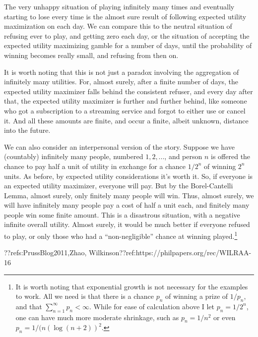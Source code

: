 The very unhappy situation of playing infinitely many times and eventually starting to lose every time is the almost 
sure result of following expected utility maximization on each day. We can compare this to the neutral situation of 
refusing ever to play, and getting zero each day, or the situation of accepting the expected utility maximizing gamble
for a number of days, until the probability of winning becomes really small, and refusing from then on.

It is worth noting that this is not just a paradox involving the aggregation of infinitely many utilities.
For, almost surely, after a finite number of days, the expected utility maximizer
falls behind the consistent refuser, and every day after that, the expected utility maximizer is further and further behind,
like someone who got a subscription to a streaming service and forgot to either use or cancel it. And all these amounts are 
finite, and occur a finite, albeit unknown, distance into the future.

We can also consider an interpersonal version of the story. Suppose we have (countably) infinitely many people, numbered $1,2,...$, and person $n$ 
is offered the chance to pay half a unit of utility in exchange for a chance $1/2^n$ of winning $2^n$ units. As before, by expected utility
considerations it's worth it. So, if everyone is an expected utility maximizer, everyone will pay. But by the Borel-Cantelli Lemma, 
almost surely, only finitely many people will win. Thus, almost surely, we will have infinitely many people
pay a cost of half a unit each, and finitely many people win some finite amount. This is a disastrous situation, with a negative infinite
overall utility. Almost surely, it would be much better if everyone refused to play, or only those who had a ``non-negligible'' chance 
at winning played.\footnote{It is worth noting that exponential growth is not necessary for the examples to work. All we need is that
there is a chance $p_n$ of winning a prize of $1/p_n$, and that $\sum_{n=1}^\infty p_n < \infty$. While for ease of calculation above
I let $p_n=1/2^n$, one can have much more moderate shrinkage, such as $p_n=1/n^2$ or even $p_n=1/(n(\log (n+2))^2$.}

??refs:PrussBlog2011,Zhao, 
Wilkinson??ref:https://philpapers.org/rec/WILRAA-16

